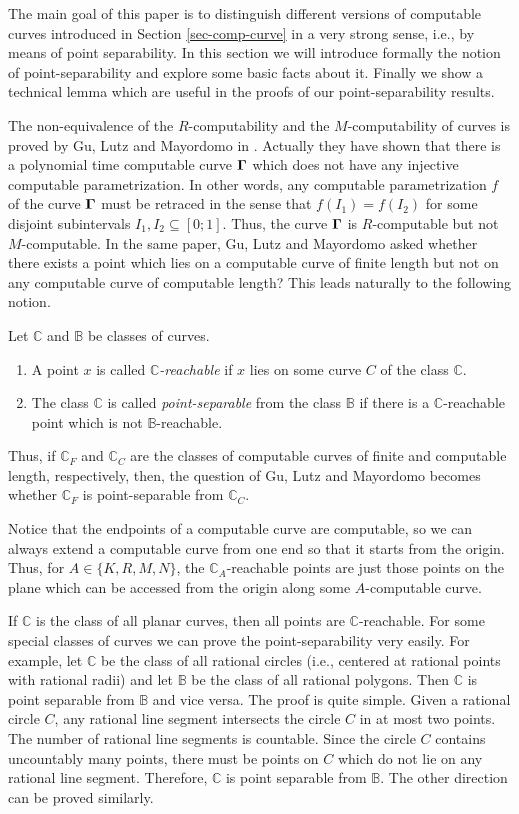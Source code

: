 \documentclass{LMCS}
\theoremstyle{plain}
\def\IB{\mathbb{B}}
\def\IC{\mathbb{C}}
\begin{document}
The main goal of this paper is to distinguish different versions of computable curves introduced in Section \ref{sec-comp-curve} in a very strong sense, i.e., by means of point separability. In this section we will introduce formally the notion of point-separability and explore some basic facts about it. Finally we show a technical lemma which are useful in the proofs of our point-separability results.

The non-equivalence of the $R$-computability and the $M$-computability of curves is proved by Gu, Lutz and Mayordomo in \cite{GLM11}. Actually they have shown that there is a polynomial time computable curve $\bf \Gamma$  which does not have any injective computable parametrization. In other words, any computable parametrization $f$ of the curve $\bf \Gamma$ must be retraced in the sense that $f(I_1) = f(I_2)$ for some disjoint subintervals $I_1, I_2 \subseteq [0; 1]$. Thus, the curve $\bf \Gamma$ is $R$-computable but not $M$-computable. In the same paper, Gu, Lutz and Mayordomo asked  whether  there exists a point which lies on a computable curve of finite length but not on any computable curve of computable length?  This leads naturally to the following notion.

\begin{defi}\label{def-point-sep}
Let $\IC$ and $\IB$ be classes of curves.
\begin{enumerate}[(1)]
    \item A point $x$ is called  {\em $\IC$-reachable} if $x$ lies on some curve $C$ of the class $\IC$.
    \item The class $\IC$ is called {\em point-separable} from the class $\IB$ if there is a $\IC$-reachable point which is not $\IB$-reachable.
\end{enumerate}
\end{defi}

\noindent Thus, if $\IC_F$ and $\IC_C$ are the classes of computable curves of finite and computable length, respectively, then, the question of Gu, Lutz and Mayordomo becomes whether $\IC_F$ is point-separable from $\IC_C$.

Notice that the endpoints of a computable curve are computable, so we can always extend a computable curve from one end so that it starts from the origin. Thus, for  $A \in \{K, R, M, N\}$, the $\IC_A$-reachable points are just those points on the plane which can be accessed from the origin along some $A$-computable curve.

If $\IC$ is the class of all planar curves, then all points are $\IC$-reachable. For some special classes of curves we can prove the point-separability very easily. For example, let $\IC$ be the class of all rational circles (i.e., centered at rational points with rational radii) and let $\IB$ be the class of all rational polygons. Then $\IC$ is point separable from $\IB$ and vice versa. The proof is quite simple. Given a rational circle $C$, any rational line segment intersects the circle $C$ in at most two points. The number of rational line segments is countable. Since the circle $C$ contains uncountably many points, there must be points on $C$ which do not lie on any rational line segment. Therefore, $\IC$ is point separable from $\IB$. The other direction can be proved similarly.
\end{document}
